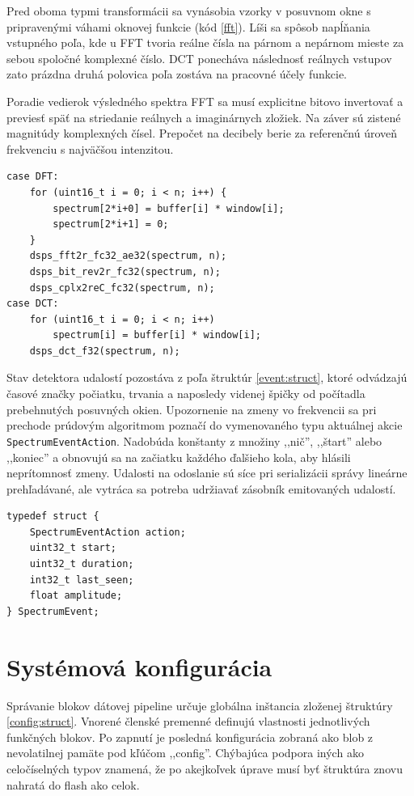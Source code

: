Pred oboma typmi transformácii sa vynásobia vzorky v posuvnom okne s pripravenými váhami oknovej funkcie (kód \ref{fft}).
Líši sa spôsob napĺňania vstupného poľa, kde u FFT tvoria reálne čísla na párnom a nepárnom mieste za sebou
spoločné komplexné číslo. DCT ponecháva následnosť reálnych vstupov zato prázdna druhá polovica poľa zostáva
na pracovné účely funkcie.

Poradie vedierok výsledného spektra FFT sa musí explicitne bitovo invertovať a previesť späť na striedanie
reálnych a imaginárnych zložiek. Na záver sú zistené magnitúdy komplexných čísel.
Prepočet na decibely berie za referenčnú úroveň frekvenciu s najväčšou intenzitou.

\begin{lstlisting}[style=cstyle,label={fft},caption=Fourierová a kosínusová transformácia s ESP DSP knižnicou]
case DFT:
	for (uint16_t i = 0; i < n; i++) {
		spectrum[2*i+0] = buffer[i] * window[i];
		spectrum[2*i+1] = 0;
	}
	dsps_fft2r_fc32_ae32(spectrum, n);
	dsps_bit_rev2r_fc32(spectrum, n);
	dsps_cplx2reC_fc32(spectrum, n);
case DCT:
	for (uint16_t i = 0; i < n; i++)
    	spectrum[i] = buffer[i] * window[i];
    dsps_dct_f32(spectrum, n);
\end{lstlisting}

Stav detektora udalostí pozostáva z poľa štruktúr \ref{event:struct}, ktoré odvádzajú časové značky
počiatku, trvania a naposledy videnej špičky od počítadla prebehnutých posuvných okien. Upozornenie na
zmeny vo frekvencii sa pri prechode prúdovým algoritmom poznačí do vymenovaného typu
aktuálnej akcie \verb|SpectrumEventAction|. Nadobúda konštanty z množiny ,,nič'', ,,štart'' alebo ,,koniec'' a
obnovujú sa na začiatku každého ďalšieho kola, aby hlásili neprítomnosť zmeny. Udalosti na odoslanie
sú síce pri serializácii správy lineárne prehľadávané, ale vytráca sa potreba udržiavať zásobník emitovaných udalostí.

\begin{lstlisting}[style=cstyle,label={event:struct},
caption={Štruktúra udalosti frekvenčného vedierka},morekeywords={SpectrumEvent}]
typedef struct {
    SpectrumEventAction action;
    uint32_t start;
    uint32_t duration;
    int32_t last_seen;
    float amplitude;
} SpectrumEvent;
\end{lstlisting}

\section{Systémová konfigurácia}
Správanie blokov dátovej pipeline určuje globálna inštancia zloženej štruktúry \ref{config:struct}.
Vnorené členské premenné definujú vlastnosti jednotlivých funkčných blokov. Po zapnutí je posledná
konfigurácia zobraná ako blob z nevolatilnej pamäte pod kľúčom ,,config''. Chýbajúca podpora iných ako celočíselných
typov znamená, že po akejkoľvek úprave musí byť štruktúra znovu nahratá do flash ako celok.

